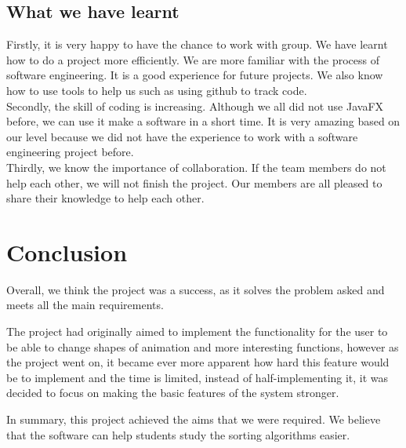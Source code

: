 \documentclass[paper=a4, fontsize=11pt,twoside]{scrartcl}		%
\begin{document}
\subsection{What we have learnt}
Firstly, it is very happy to have the chance to work with group. We have learnt how to do a project more efficiently. We are more familiar with the process of software engineering. It is a good experience for future projects. We also know how to use tools to help us such as using github to track code.\\

Secondly, the skill of coding is increasing. Although we all did not use JavaFX before, we can use it make a software in a short time. It is very amazing based on our level because we did not have the experience to work with a software engineering project before.\\

Thirdly, we know the importance of collaboration. If the team members do not help each other, we will not finish the project. Our members are all pleased to share their knowledge to help each other.\\












\section{Conclusion}
Overall, we think the project was a success, as it solves the problem asked and meets all the main requirements.

The project had originally aimed to implement the functionality for the user to be able to change shapes of animation and more interesting functions, however as the project went on, it became ever more apparent how hard this feature would be to implement and the time is limited, instead of half-implementing it, it was decided to focus on making the basic features of the system stronger. 

In summary, this project achieved the aims that we were required. We believe that the software can help students study the sorting algorithms easier.


\end{document}
